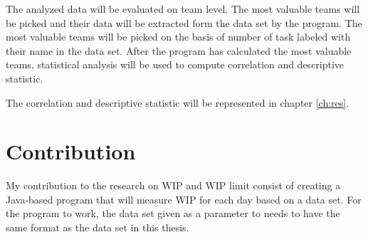 \documentclass[UKenglish]{ifimaster}  %
\begin{document}
The analyzed data will be evaluated on team level. The most valuable teams will be picked and their data will be extracted form the data set by the program.  The most valuable teams will be picked on the basis of number of task labeled with their name in the data set.  After the program has calculated the most valuable teams, statistical analysis will be used to compute correlation and descriptive statistic.

The correlation and  descriptive statistic will be represented in chapter \ref{ch:res}. 
\section{Contribution}
My contribution to the research on WIP and WIP limit consist of creating a Java-based program that will measure WIP for each day based on a data set. For the program to work, the data set given as a parameter to needs to have the same format as the data set in this thesis. 
\end{document}
